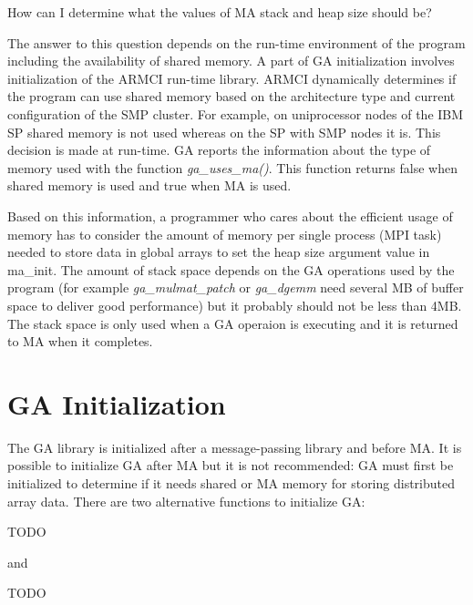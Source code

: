 How can I determine what the values of MA stack and heap size should be? 

The answer to this question depends on the run-time environment of the program
including the availability of shared memory. A part of GA initialization
involves initialization of the ARMCI run-time library.  ARMCI dynamically
determines if the program can use shared memory based on the architecture type
and current configuration of the SMP cluster. For example, on uniprocessor
nodes of the IBM SP shared memory is not used whereas on the SP with SMP nodes
it is. This decision is made at run-time. GA reports the information about the
type of memory used with the function \emph{ga\_uses\_ma()}. This function
returns false when shared memory is used and true when MA is used.

Based on this information, a programmer who cares about the efficient usage of
memory has to consider the amount of memory per single process (MPI task)
needed to store data in global arrays to set the heap size argument value in
ma\_init. The amount of stack space depends on the GA operations used by the
program (for example \emph{ga\_mulmat\_patch} or \emph{ga\_dgemm} need several
MB of buffer space to deliver good performance) but it probably should not be
less than 4MB.  The stack space is only used when a GA operaion is executing
and it is returned to MA when it completes. 

\section{GA Initialization}

The GA library is initialized after a message-passing library and before MA. It
is possible to initialize GA after MA but it is not recommended: GA must first
be initialized to determine if it needs shared or MA memory for storing
distributed array data. There are two alternative functions to initialize GA:

TODO

and

TODO

